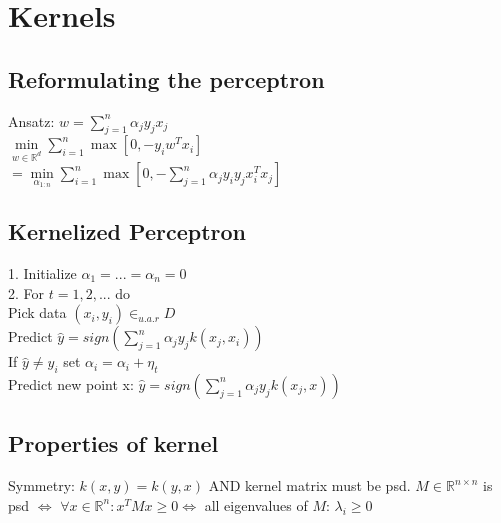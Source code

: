 \section*{Kernels}
\subsection*{Reformulating the perceptron}
Ansatz: $w=\sum_{j=1}^n \alpha_j y_j x_j$\\
$\min \limits_{w\in\mathbb{R}^d} \sum_{i=1}^n \max [0, -y_i w^T x_i]$\\
$= \min \limits_{\alpha_{1:n}} \sum_{i=1}^n \max  [0,- \sum_{j=1}^n \alpha_j y_i y_j x_i^T x_j ]$


\subsection*{Kernelized Perceptron}
1. Initialize $\alpha_1 = ... = \alpha_n = 0$\\
2. For $t = 1, 2, ...$ do \\
Pick data $(x_i,y_i) \in_{u.a.r} D$\\
Predict $\hat{y} = sign(\sum_{j=1}^n \alpha_j y_j k(x_j,x_i))$\\
If $\hat{y} \not = y_i$ set $\alpha_i = \alpha_i + \eta_t$\\
Predict new point x: $\hat{y} = sign(\sum_{j=1}^n \alpha_j y_j k(x_j,x))$

\subsection*{Properties of kernel}
Symmetry: $k(x,y) = k(y,x)$ AND kernel matrix must be psd.
$M \in \mathbb{R}^{n\times n}$ is psd $\Leftrightarrow$ 
$\forall x \in \mathbb{R}^n: x^TMx \geq 0 \Leftrightarrow$
all eigenvalues of $M$: $\lambda_i\geq 0$

